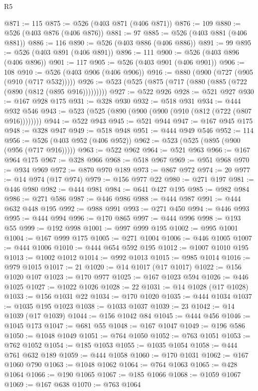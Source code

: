 \begin{lexlean}{R5}
\begin{coremodule}
@871 := 115
@875 := @526 (@403 @871 (@406 @871))
@876 := 109
@880 := @526 (@403 @876 (@406 @876))
@881 := 97
@885 := @526 (@403 @881 (@406 @881))
@886 := 116
@890 := @526 (@403 @886 (@406 @886))
@891 := 99
@895 := @526 (@403 @891 (@406 @891))
@896 := 111
@900 := @526 (@403 @896 (@406 @896))
@901 := 117
@905 := @526 (@403 @901 (@406 @901))
@906 := 108
@910 := @526 (@403 @906 (@406 @906))
@916 := @880 (@900 (@727 (@905 (@910 (@717 @532)))))
@926 := @523 (@525 (@875 (@717 (@880 (@885 (@722 (@890 (@812 (@895 @916)))))))))
@927 := @522 @926
@928 := @521 @927
@930 := @167 @928 @175
@931 := @328 @930
@932 := @518 @931
@934 := @444 @932 @546
@943 := @523 (@525 (@890 (@900 (@900 (@910 (@812 (@722 (@807 @916))))))))
@944 := @522 @943
@945 := @521 @944
@947 := @167 @945 @175
@948 := @328 @947
@949 := @518 @948
@951 := @444 @949 @546
@952 := 114
@956 := @526 (@403 @952 (@406 @952))
@962 := @523 (@525 (@895 (@900 (@956 (@717 @916)))))
@963 := @522 @962
@964 := @521 @963
@966 := @167 @964 @175
@967 := @328 @966
@968 := @518 @967
@969 := @951 @968
@970 := @934 @969
@972 := @870 @970 @189
@973 := @867 @972
@974 := 20
@977 := @14 @974 (@17 @974)
@979 := @156 @977 @22
@980 := @271 @197
@981 := @446 @980
@982 := @444 @981
@984 := @641 @427 @195
@985 := @982 @984
@986 := @271 @586
@987 := @446 @986
@988 := @444 @987
@991 := @444 @632 @448 @195
@992 := @988 @991
@993 := @271 @450
@994 := @446 @993
@995 := @444 @994
@996 := @170 @865
@997 := @444 @996
@998 := @193 @55
@999 := @192 @998
@1001 := @997 @999 @195
@1002 := @995 @1001
@1004 := @167 @999 @175
@1005 := @271 @1004
@1006 := @446 @1005
@1007 := @444 @1006
@1010 := @444 @654 @592 @195
@1012 := @1007 @1010 @195
@1013 := @1002 @1012
@1014 := @992 @1013
@1015 := @985 @1014
@1016 := @979 @1015
@1017 := 21
@1020 := @14 @1017 (@17 @1017)
@1022 := @156 @1020 @107
@1023 := @170 @977
@1025 := @167 @1023 @594
@1026 := @446 @1025
@1027 := @1022 @1026
@1028 := 22
@1031 := @14 @1028 (@17 @1028)
@1033 := @156 @1031 @22
@1034 := @170 @1020
@1035 := @444 @1034
@1037 := @1035 @195 @1023
@1038 := @1033 @1037
@1039 := 23
@1042 := @14 @1039 (@17 @1039)
@1044 := @156 @1042 @84
@1045 := @444 @456
@1046 := @1045 @173
@1047 := @681 @55
@1048 := @167 @1047
@1049 := @196 @586
@1050 := @1048 @1049
@1051 := @764 @1050
@1052 := @763 @1051
@1053 := @762 @1052
@1054 := @185 @1053
@1055 := @1035 @1054
@1058 := @444 @761 @632 @189
@1059 := @444 @1058
@1060 := @170 @1031
@1062 := @167 @1060 @790
@1063 := @1048 @1062
@1064 := @764 @1063
@1065 := @428 @1064
@1066 := @190 @1065
@1067 := @185 @1066
@1068 := @1059 @1067
@1069 := @167 @638
@1070 := @763 @1064

\end{coremodule}
\end{lexlean}
